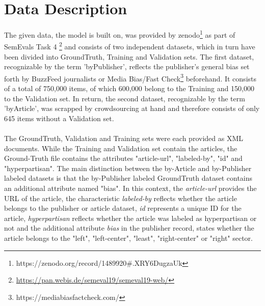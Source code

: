 \documentclass[a4paper, 11pt,titlepage,oneside,openany]{book}
\begin{document}
\chapter{Data Description}
\indent The given data, the model is built on, was provided by zenodo\footnote{https://zenodo.org/record/1489920\#.XRY6DugzaUk} as part of SemEvals Task 4 \footnote{\url{https://pan.webis.de/semeval19/semeval19-web/}} and consists of two independent datasets, which in turn have been divided into GroundTruth, Training and Validation sets.
The first dataset, recognizable by the term 'byPublisher', reflects the publisher's general bias set forth by BuzzFeed journalists or Media Bias/Fast Check\footnote{https://mediabiasfactcheck.com/} beforehand. It consists of a total of 750,000 items, of which 600,000 belong to the Training and 150,000 to the Validation set.
In return, the second dataset, recognizable by the term 'byArticle', was scrapped by crowdsourcing at hand and therefore consists of only 645 items without a Validation set.\\
 \\
\indent The GroundTruth, Validation and Training sets were each provided as XML documents. While the Training and Validation set contain the articles, the Ground-Truth file contains the attributes "article-url", "labeled-by", "id" and "hyperpartisan". The main distinction between the by-Article and by-Publisher labeled datasets is that the by-Publisher labeled GroundTruth dataset contains an additional attribute named "bias". In this context, the \textit{article-url} provides the URL of the article, the characteristic \textit{labeled-by} reflects whether the article belongs to the publisher or article dataset, \textit{id} represents a unique ID for the article, \textit{hyperpartisan} reflects whether the article was labeled as hyperpartisan or not and the additional attribute \textit{bias} in the publisher record, states whether the article belongs to the "left", "left-center", "least", "right-center" or "right" sector.
 
\newpage
\end{document}
